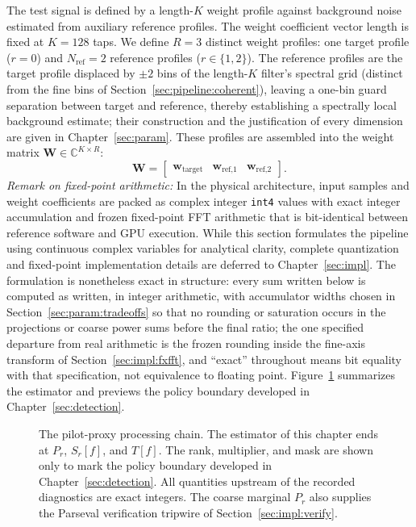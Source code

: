 The test signal is defined by a length-$K$ weight profile against background noise estimated from auxiliary reference profiles. The weight coefficient vector length is fixed at $K = 128$ taps. We define $R = 3$ distinct weight profiles: one target profile ($r = 0$) and $N_{\text{ref}} = 2$ reference profiles ($r \in \{1, 2\}$). The reference profiles are the target profile displaced by $\pm 2$ bins of the length-$K$ filter's spectral grid (distinct from the fine bins of Section~\ref{sec:pipeline:coherent}), leaving a one-bin guard separation between target and reference, thereby establishing a spectrally local background estimate; their construction and the justification of every dimension are given in Chapter~\ref{sec:param}. These profiles are assembled into the weight matrix $\mathbf{W} \in \mathbb{C}^{K \times R}$:
\begin{equation}
\mathbf{W} = \begin{bmatrix}
\mathbf{w}_{\text{target}} & \mathbf{w}_{\text{ref,1}} & \mathbf{w}_{\text{ref,2}}
\end{bmatrix}.
\end{equation}
\textit{Remark on fixed-point arithmetic:} In the physical architecture, input samples and weight coefficients are packed as complex integer \texttt{int4} values with exact integer accumulation and frozen fixed-point FFT arithmetic that is bit-identical between reference software and GPU execution. While this section formulates the pipeline using continuous complex variables for analytical clarity, complete quantization and fixed-point implementation details are deferred to Chapter~\ref{sec:impl}. The formulation is nonetheless exact in structure: every sum written below is computed as written, in integer arithmetic, with accumulator widths chosen in Section~\ref{sec:param:tradeoffs} so that no rounding or saturation occurs in the projections or coarse power sums before the final ratio; the one specified departure from real arithmetic is the frozen rounding inside the fine-axis transform of Section~\ref{sec:impl:fxfft}, and ``exact'' throughout means bit equality with that specification, not equivalence to floating point. Figure~\ref{fig:pipeline} summarizes the estimator and previews the policy boundary developed in Chapter~\ref{sec:detection}.

\begin{figure}[t]
\centering
\resizebox{\linewidth}{!}{}
\caption[The pilot-proxy processing chain]{The pilot-proxy processing chain. The estimator of this chapter ends at $P_r$, $S_r[f]$, and $T[f]$. The rank, multiplier, and mask are shown only to mark the policy boundary developed in Chapter~\ref{sec:detection}. All quantities upstream of the recorded diagnostics are exact integers. The coarse marginal $P_r$ also supplies the Parseval verification tripwire of Section~\ref{sec:impl:verify}.}
\label{fig:pipeline}
\end{figure}

